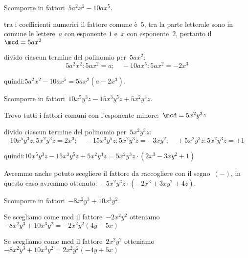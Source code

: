 \begin{esempio}
Scomporre in fattori~\(5a^{2}x^2-10ax^{5}\).
  \begin{enumeratea}
  \item tra i coefficienti numerici il fattore comune è~\(5\), 
   tra la parte letterale sono in comune le lettere~\(a\) con esponente \(1\) 
   e~\(x\) con esponente~\(2\), pertanto il~\(\mcd=5ax^2\)
 \item divido ciascun termine del polinomio per~\(5ax^2\):
 \[5a^{2}x^2:5ax^2=a; \quad -10ax^{5}:5ax^2=-2x^3\]
  \item quindi:\quad \(5a^{2}x^2-10ax^{5}=5ax^2(a-2x^3)\).
  \end{enumeratea}
 \end{esempio}

 \begin{esempio}
Scomporre in fattori~\(10x^{5}y^{3}z-15x^3y^{5}z+5x^2y^{3}z\).
 \begin{enumeratea}
 \item Trovo tutti i fattori comuni con l'esponente 
minore:~\(\mcd=5x^2y^{3}z\)
 \item divido ciascun termine del polinomio per~\(5x^2y^{3}z\):
\[10x^{5}y^{3}z:5x^2y^{3}z=2x^3; \quad
-15x^3y^{5}z:5x^2y^{3}z=-3xy^{2}; \quad
+5x^2y^{3}z:5x^2y^{3}z=+1\]
 \item quindi:\quad \(10x^{5}y^{3}z-15x^3y^{5}z+5x^2y^{3}z =
 5x^2y^{3}z \cdot (2x^3-3xy^{2}+1)\)
 \end{enumeratea}
 \end{esempio}

 
\osservazione Avremmo anche potuto scegliere il fattore da raccogliere 
 con il segno~\((-)\), in questo caso avremmo 
 ottenuto:~\(-5x^2y^{3}z\cdot (-2x^3+3xy^{2}+4z)\).
 
 \begin{esempio}
Scomporre in fattori~\(-8x^2y^{3}+10x^3y^{2}\).
 \begin{enumerate*}
 \item  Se scegliamo come mcd il fattore~\(-2x^2y^{2}\)
  otteniamo~\(-8x^2y^{3}+10x^3y^{2}=-2x^2y^{2}(4y-5x)\)
 \item Se scegliamo come mcd il fattore~\(2x^2y^{2}\)
  otteniamo~\(-8x^2y^{3}+10x^3y^{2}=2x^2y^{2}(-4y+5x)\)
 \end{enumerate*}
 \end{esempio}

